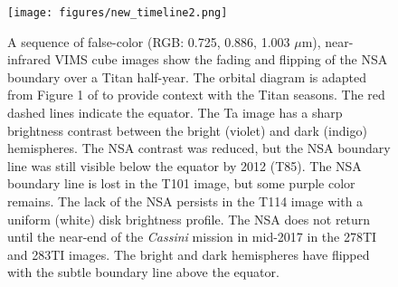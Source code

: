 \documentclass[apj,tighten]{emulateapj}
\begin{document}
\begin{figure}[tbhp]
\centering
\texttt{[image: figures/new\_timeline2.png]}
\caption{\footnotesize A sequence of false-color (RGB: 0.725, 0.886, 1.003 $\mu$m), near-infrared VIMS cube images show the fading and flipping of the NSA boundary over a Titan half-year. The orbital diagram is adapted from Figure 1 of \citep{seignovert2021haze} to provide context with the Titan seasons. The red dashed lines indicate the equator. The Ta image has a sharp brightness contrast between the bright (violet) and dark (indigo) hemispheres. The NSA contrast was reduced, but the NSA boundary line was still visible below the equator by 2012 (T85). The NSA boundary line is lost in the T101 image, but some purple color remains. The lack of the NSA persists in the T114 image with a uniform (white) disk brightness profile. The NSA does not return until the near-end of the \textit{Cassini} mission in mid-2017 in the 278TI and 283TI images. The bright and dark hemispheres have flipped with the subtle boundary line above the equator.
\label{figure:nsadisappears}}
\end{figure}
\end{document}
